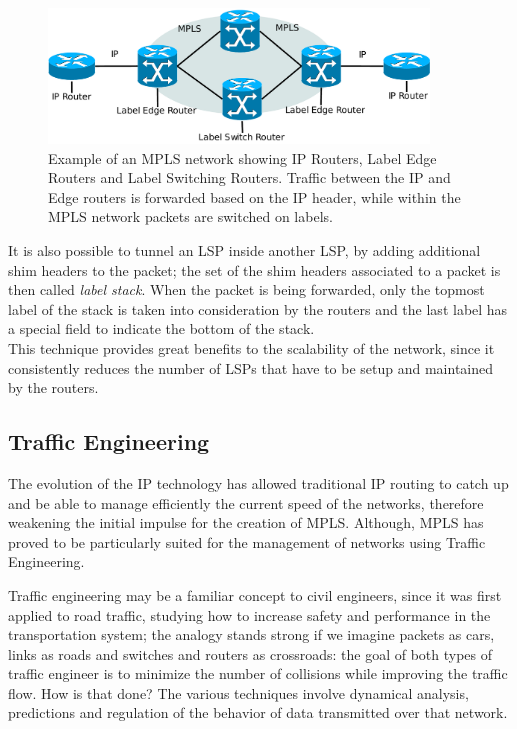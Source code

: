 \documentclass[10pt,a4paper]{report}
\begin{document}
\begin{figure}[!hbp]
  \centering
  \includegraphics[width=0.9\textwidth]{img/mpls_net}
  \caption[MPLS network example]{Example of an MPLS network showing IP
    Routers, Label Edge Routers and Label Switching Routers. Traffic
    between the IP and Edge routers is forwarded based on the IP
    header, while within the MPLS network packets are switched on
    labels.}
  \label{fig:mpls_net}
\end{figure}

\newpage

It is also possible to tunnel an LSP inside another LSP, by adding
additional shim headers to the packet; the set of the shim headers
associated to a packet is then called \textit{label stack}. When the
packet is being forwarded, only the topmost label of the stack is
taken into consideration by the routers and the last label has a
special field to indicate the bottom of the stack. \\
This technique provides great benefits to the scalability of the
network, since it consistently reduces the number of LSPs that have to
be setup and maintained by the routers.

\subsection{Traffic Engineering}
The evolution of the IP technology has allowed traditional IP routing
to catch up and be able to manage efficiently the current speed of the
networks, therefore weakening the initial impulse for the creation of
MPLS\@. Although, MPLS has proved to be particularly suited for the
management of networks using Traffic Engineering.

Traffic engineering may be a familiar concept to civil engineers,
since it was first applied to road traffic, studying how to increase
safety and performance in the transportation system; the analogy
stands strong if we imagine packets as cars, links as roads and
switches and routers as crossroads: the goal of both types of traffic
engineer is to minimize the number of collisions while improving the
traffic flow. How is that done? The various techniques involve
dynamical analysis, predictions and regulation of the behavior of data
transmitted over that network.
\end{document}
